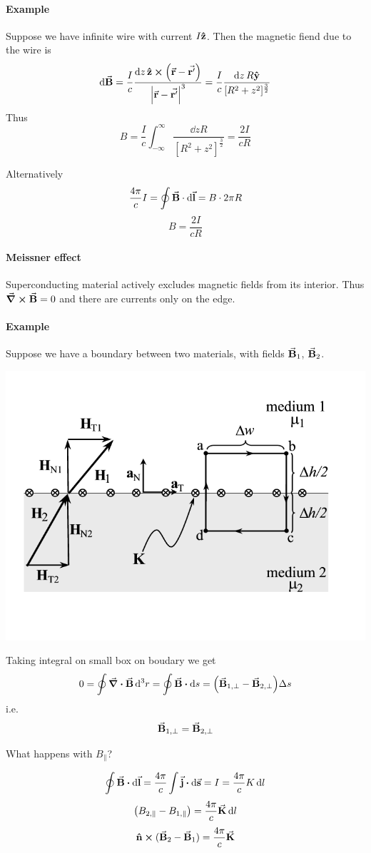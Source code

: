 \paragraph{Example}
Suppose we have infinite wire with current $I\vu{z}$. Then the magnetic fiend due to the wire is
$$\dd{\va{B}} = \frac{I}{c}\frac{\dd{z}\vu{z} \cross \qty(\va{r}-\va{r'})}{\abs{\va{r}-\va{r'}}^3} = \frac{I}{c} \frac{\dd{z} R \vu{y}}{[R^2+z^2]^{\frac{3}{2}}}$$
Thus
$$B = \frac{I}{c} \int_{-\infty}^{\infty} \frac{\dd{z}R}{[R^2+z^2]^{\frac{3}{2}}} = \frac{2I}{cR}$$

Alternatively
$$\frac{4\pi}{c}I = \oint \va{B}\cdot \dd{\va{l}} = B \cdot 2\pi R$$
$$B = \frac{2I}{cR}$$
\paragraph{Meissner effect} Superconducting material actively excludes magnetic fields from its interior. Thus $\curl{\va{B}} = 0$ and there are currents only on the edge.
\paragraph{Example}
Suppose we have a boundary between two materials, with fields $\va{B}_1$, $\va{B}_2$. 
\begin{center}
	\includegraphics[width=0.5\linewidth]{./lect7/pic1.png}
\end{center}
Taking integral on small box on boudary we get
$$0 = \oint \div{\va{B}} \dd[3]{r} = \oint \va{B} \vdot \dd{s} = \qty(\va{B}_{1,\perp}-\va{B}_{2,\perp}) \Delta s$$
i.e. 
$$\va{B}_{1,\perp}=\va{B}_{2,\perp}$$

What happens with $B_\parallel$?

$$\oint \va{B}\vdot \dd{\va{l}} = \frac{4\pi}{c} \int \va{j} \vdot \dd{\va{s}} = I  = \frac{4\pi}{c} K \dd{l}$$
$$\qty(B_{2, \parallel} - B_{1, \parallel}) = \frac{4\pi}{c} \va{K}  \dd{l}$$
$$\vu{n} \cross (\va{B}_2 - \va{B}_1) = \frac{4\pi}{c} \va{K} $$
